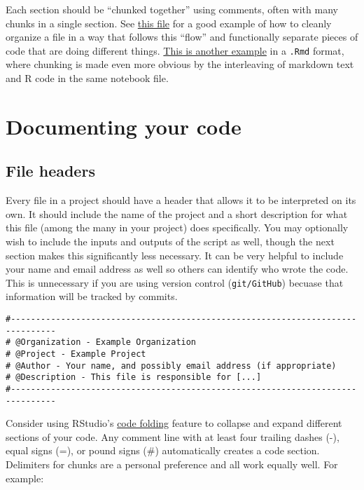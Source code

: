 \documentclass[]{book}
\begin{document}
Each section should be ``chunked together'' using comments, often with many chunks in a single section. See \href{https://github.com/kmishra9/Flu-Absenteeism/blob/master/Master's\%20Thesis\%20-\%20Spatial\%20Epidemiology\%20of\%20Influenza/2a\%20-\%20Statistical-Inputs.R}{this file} for a good example of how to cleanly organize a file in a way that follows this ``flow'' and functionally separate pieces of code that are doing different things. \href{https://github.com/ben-arnold/enterics-seroepi/blob/master/R/Fig1-haiti-ab-distributions.Rmd}{This is another example} in a \texttt{.Rmd} format, where chunking is made even more obvious by the interleaving of markdown text and R code in the same notebook file.

\hypertarget{documenting-your-code}{%
\section{Documenting your code}\label{documenting-your-code}}

\hypertarget{file-headers}{%
\subsection{File headers}\label{file-headers}}

Every file in a project should have a header that allows it to be interpreted on its own. It should include the name of the project and a short description for what this file (among the many in your project) does specifically. You may optionally wish to include the inputs and outputs of the script as well, though the next section makes this significantly less necessary. It can be very helpful to include your name and email address as well so others can identify who wrote the code. This is unnecessary if you are using version control (\texttt{git/GitHub}) becuase that information will be tracked by commits.

\begin{verbatim}
#-------------------------------------------------------------------------------
# @Organization - Example Organization
# @Project - Example Project
# @Author - Your name, and possibly email address (if appropriate)
# @Description - This file is responsible for [...]
#-------------------------------------------------------------------------------
\end{verbatim}

Consider using RStudio's \href{https://support.rstudio.com/hc/en-us/articles/200484568-Code-Folding-and-Sections}{code folding} feature to collapse and expand different sections of your code. Any comment line with at least four trailing dashes (-), equal signs (=), or pound signs (\#) automatically creates a code section. Delimiters for chunks are a personal preference and all work equally well. For example:
\end{document}
